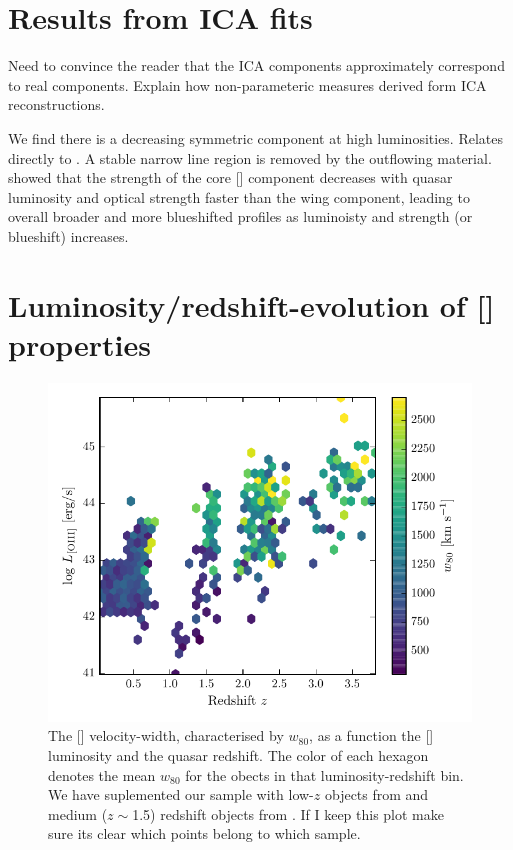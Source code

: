 \section{Results from ICA fits}

Need to convince the reader that the ICA components approximately correspond to real components. 
Explain how non-parameteric measures derived form ICA reconstructions. 

We find there is a decreasing symmetric component at high luminosities. 
Relates directly to \citet{shen14}. 
A stable narrow line region is removed by the outflowing material. 
\citet{shen14} showed that the strength of the core [] component decreases with quasar luminosity and optical  strength faster than the wing component, leading to overall broader and more blueshifted profiles as luminoisty and  strength (or  blueshift) increases. 

\section{Luminosity/redshift-evolution of [] properties}

\begin{figure}
    \includegraphics[width=\columnwidth]{figures/chapter04/oiii_luminosity_z_w80.pdf} 
    \caption{The [] velocity-width, characterised by $w_{80}$, as a function the [] luminosity and the quasar redshift. The color of each hexagon denotes the mean $w_{80}$ for the obects in that luminosity-redshift bin. We have suplemented our sample with low-$z$ objects from \citet{zakamska14} and medium ($z\sim$1.5) redshift objects from \citet{harrison16}. If I keep this plot make sure its clear which points belong to which sample.}       
    \label{fig:oiii_luminosity_z_w80}
\end{figure}

